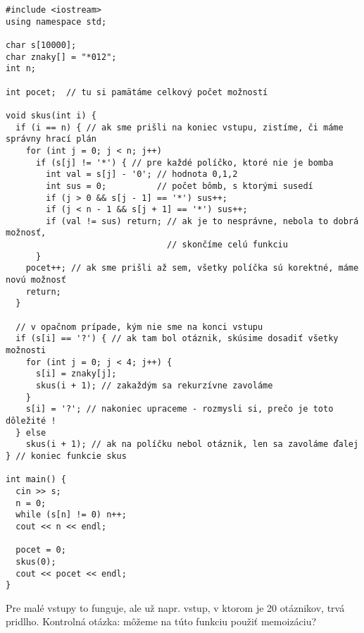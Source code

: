 \begin{lstlisting}
#include <iostream>
using namespace std;

char s[10000];
char znaky[] = "*012";
int n;

int pocet;  // tu si pamätáme celkový počet možností

void skus(int i) {
  if (i == n) { // ak sme prišli na koniec vstupu, zistíme, či máme správny hrací plán
    for (int j = 0; j < n; j++)
      if (s[j] != '*') { // pre každé políčko, ktoré nie je bomba
        int val = s[j] - '0'; // hodnota 0,1,2
        int sus = 0;          // počet bômb, s ktorými susedí
        if (j > 0 && s[j - 1] == '*') sus++;
        if (j < n - 1 && s[j + 1] == '*') sus++;
        if (val != sus) return; // ak je to nesprávne, nebola to dobrá možnosť, 
                                // skončíme celú funkciu
      }
    pocet++; // ak sme prišli až sem, všetky políčka sú korektné, máme novú možnosť
    return;
  }

  // v opačnom prípade, kým nie sme na konci vstupu
  if (s[i] == '?') { // ak tam bol otáznik, skúsime dosadiť všetky možnosti
    for (int j = 0; j < 4; j++) {
      s[i] = znaky[j];
      skus(i + 1); // zakaždým sa rekurzívne zavoláme
    }
    s[i] = '?'; // nakoniec upraceme - rozmysli si, prečo je toto dôležité !
  } else
    skus(i + 1); // ak na políčku nebol otáznik, len sa zavoláme ďalej
} // koniec funkcie skus

int main() {
  cin >> s;
  n = 0;
  while (s[n] != 0) n++;
  cout << n << endl;

  pocet = 0;
  skus(0);
  cout << pocet << endl;
}
\end{lstlisting}


Pre malé vstupy to funguje, ale už napr. vstup, v ktorom je 20 otáznikov, trvá pridlho. Kontrolná 
otázka: môžeme na túto funkciu použiť memoizáciu?



